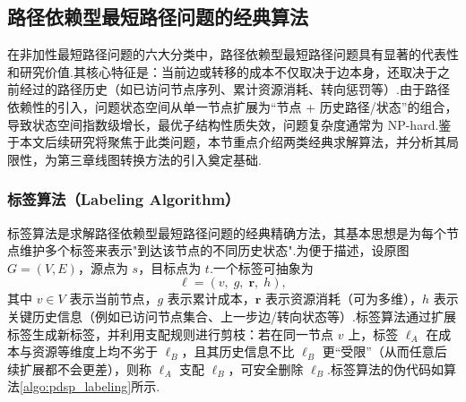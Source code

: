 \subsection{路径依赖型最短路径问题的经典算法}

在非加性最短路径问题的六大分类中，路径依赖型最短路径问题具有显著的代表性和研究价值.其核心特征是：当前边或转移的成本不仅取决于边本身，还取决于之前经过的路径历史（如已访问节点序列、累计资源消耗、转向惩罚等）.由于路径依赖性的引入，问题状态空间从单一节点扩展为“节点 + 历史路径/状态”的组合，导致状态空间指数级增长，最优子结构性质失效，问题复杂度通常为 NP-hard\cite{gj1979np}.鉴于本文后续研究将聚焦于此类问题，本节重点介绍两类经典求解算法，并分析其局限性，为第三章线图转换方法的引入奠定基础.

\subsubsection{标签算法（Labeling Algorithm）}

标签算法是求解路径依赖型最短路径问题的经典精确方法，其基本思想是为每个节点维护多个标签来表示"到达该节点的不同历史状态"\cite{irnich2005spprc}.为便于描述，设原图 $G=(V,E)$，源点为 $s$，目标点为 $t$.一个标签可抽象为
\[
  \ell = (v,\; g,\; \mathbf{r},\; h),
\]
其中 $v\in V$ 表示当前节点，$g$ 表示累计成本，$\mathbf{r}$ 表示资源消耗（可为多维），$h$ 表示关键历史信息（例如已访问节点集合、上一步边/转向状态等）.标签算法通过扩展标签生成新标签，并利用支配规则进行剪枝：若在同一节点 $v$ 上，标签 $\ell_A$ 在成本与资源等维度上均不劣于 $\ell_B$，且其历史信息不比 $\ell_B$ 更“受限”（从而任意后续扩展都不会更差），则称 $\ell_A$ 支配 $\ell_B$，可安全删除 $\ell_B$.标签算法的伪代码如算法\ref{algo:pdsp_labeling}所示.

